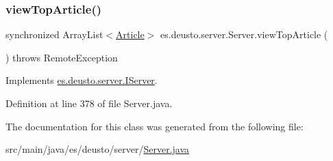 \subsubsection{\texorpdfstring{view\+Top\+Article()}{viewTopArticle()}}
{\footnotesize\ttfamily synchronized Array\+List$<$\hyperlink{classes_1_1deusto_1_1server_1_1jdo_1_1_article}{Article}$>$ es.\+deusto.\+server.\+Server.\+view\+Top\+Article (\begin{DoxyParamCaption}{ }\end{DoxyParamCaption}) throws Remote\+Exception}



Implements \hyperlink{interfacees_1_1deusto_1_1server_1_1_i_server_ab1b33472017b55ae84bf849430db5f1b}{es.\+deusto.\+server.\+I\+Server}.



Definition at line 378 of file Server.\+java.



The documentation for this class was generated from the following file\+:\begin{DoxyCompactItemize}
\item 
src/main/java/es/deusto/server/\hyperlink{_server_8java}{Server.\+java}\end{DoxyCompactItemize}
